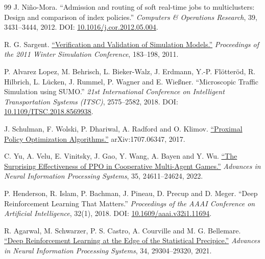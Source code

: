 \documentclass[12pt,a4paper]{article}
\begin{document}
\begin{thebibliography}{99}
 J. Niño-Mora. ``Admission and routing of soft real-time jobs to multiclusters: Design and comparison of index policies.'' \emph{Computers \& Operations Research}, 39, 3431--3444, 2012. DOI: \href{\detokenize{https://arxiv.org/abs/2207.12815}}{10.1016/j.cor.2012.05.004}.

 R. G. Sargent. \href{\detokenize{https://www.informs-sim.org/wsc11papers/016.pdf}}{``Verification and Validation of Simulation Models.''} \emph{Proceedings of the 2011 Winter Simulation Conference}, 183--198, 2011.

 P. Alvarez Lopez, M. Behrisch, L. Bieker-Walz, J. Erdmann, Y.-P. Flötteröd, R. Hilbrich, L. Lücken, J. Rummel, P. Wagner and E. Wießner. ``Microscopic Traffic Simulation using SUMO.'' \emph{21st International Conference on Intelligent Transportation Systems (ITSC)}, 2575--2582, 2018. DOI: \href{\detokenize{https://elib.dlr.de/127994/}}{10.1109/ITSC.2018.8569938}.

 J. Schulman, F. Wolski, P. Dhariwal, A. Radford and O. Klimov. \href{\detokenize{https://arxiv.org/abs/1707.06347}}{``Proximal Policy Optimization Algorithms.''} arXiv:1707.06347, 2017.

 C. Yu, A. Velu, E. Vinitsky, J. Gao, Y. Wang, A. Bayen and Y. Wu. \href{\detokenize{https://papers.nips.cc/paper/2022/file/9c1535a02f0ce079433344e14d910597-Paper-Datasets_and_Benchmarks.pdf}}{``The Surprising Effectiveness of PPO in Cooperative Multi-Agent Games.''} \emph{Advances in Neural Information Processing Systems}, 35, 24611--24624, 2022.

 P. Henderson, R. Islam, P. Bachman, J. Pineau, D. Precup and D. Meger. ``Deep Reinforcement Learning That Matters.'' \emph{Proceedings of the AAAI Conference on Artificial Intelligence}, 32(1), 2018. DOI: \href{\detokenize{https://ojs.aaai.org/index.php/AAAI/article/view/11694}}{10.1609/aaai.v32i1.11694}.

 R. Agarwal, M. Schwarzer, P. S. Castro, A. Courville and M. G. Bellemare. \href{\detokenize{https://proceedings.neurips.cc/paper/2021/hash/f514cec81cb148559cf475e7426eed5e-Abstract.html}}{``Deep Reinforcement Learning at the Edge of the Statistical Precipice.''} \emph{Advances in Neural Information Processing Systems}, 34, 29304--29320, 2021.


\end{thebibliography}
\end{document}
